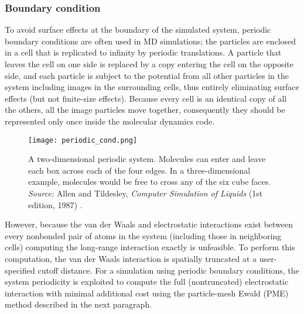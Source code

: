 \vspace{0.25cm}

\subsubsection{Boundary condition}
To avoid surface effects at the boundary of the simulated system, periodic boundary conditions are often used in MD simulations; the particles are enclosed in a cell that is replicated to infinity by periodic translations. A particle that leaves the cell on one side is replaced by a copy entering the cell on the opposite side, and each particle is subject to the potential from all other particles in the system including images in the surrounding cells, thus entirely eliminating surface effects (but not finite-size effects). Because every cell is an identical copy of all the others, all the image particles move together, consequently they should be represented only once inside the molecular dynamics code.

\begin{figure}[H]
\centering
\begin{minipage}[t]{0.75\textwidth}
	\centering
    \texttt{[image: periodic\_cond.png]}
    
    \footnotesize{\caption{A two-dimensional periodic system. Molecules can enter and leave each box across each of the four edges. In a three-dimensional example, molecules would be free to cross any of the six cube faces.
    \textit{Source:} Allen and Tildesley, \textit{Computer Simulation of Liquids} (1st edition, 1987) 
    \cite{ref:AllenTildesley_1ed}.}
    \label{fig:PME}
    }
\end{minipage} 
\end{figure}

However, because the van der Waals and electrostatic interactions exist between every nonbonded pair of atoms in the system (including those in neighboring cells) computing the long-range interaction exactly is unfeasible. To perform this computation, the van der Waals interaction is spatially truncated at a user-specified cutoff distance. For a simulation using periodic boundary conditions, the system periodicity is exploited to compute the full (nontruncated) electrostatic interaction with minimal additional cost using the particle-mesh Ewald (PME) method described in the next paragraph.

\vspace{0.25cm}

